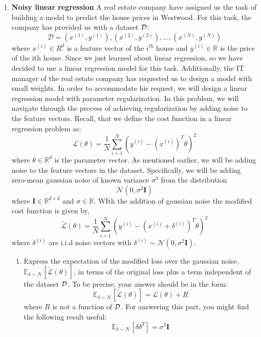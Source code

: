 \documentclass{article}
\newcommand{\R}{\mathbb{R}}
\renewcommand{\it}[1]{\textit{{#1}}}
\renewcommand{\bf}[1]{\textbf{{#1}}}
\begin{document}
    \begin{enumerate}
        \item \bf{Noisy linear regression} \vspace{11pt}
            A real estate company have assigned us the task of building a model to predict the house
            prices in Westwood. For this task, the company has provided us with a dataset $\cal{D}$:
            \[\mathcal{D} = {(x^{(1)}, y^{(1)}), (x^{(2)}, y^{(2)}), \ldots, (x^{(N)}, y^{(N)})}\]
            where $x^{(i)} \in R^d$ is a feature vector of the $i^{\it{th}}$ house and $y^{(i)} \in \R$ 
            is the price of the ith house. Since we just learned about linear regression, so we have 
            decided to use a linear regression model for this task. Additionally, the IT manager of 
            the real estate company has requested us to design a model with small weights. In order 
            to accommodate his request, we will design a linear regression model with parameter 
            regularization. In this problem, we will navigate through the process of achieving 
            regularization by adding noise to the feature vectors. Recall, that we define the cost 
            function in a linear regression problem as:
            \[\mathcal{L} (\theta) = \frac{1}{N} \sum^{N}_{i = 1} (y^{(i)} - (x^{(i)})^T \theta)^2\]
            where $\theta \in \R^d$ is the parameter vector. As mentioned earlier, we will be adding 
            noise to the feature vectors in the dataset. Specifically, we will be adding zero-mean 
            gaussian noise of known variance $\sigma^2$ from the distribution
            \[\mathcal{N} (0, \sigma^2 \bf{I})\]
            where $\bf{I} \in \R^{d \times d}$ and $\sigma \in \R$. WIth the addition of gaussian
            noise the modified cost function is given by,
            \[\tilde{\mathcal{L}} (\theta) = \frac{1}{N}\sum^{N}_{i = 1} (y^{(i)} - (x^{(i)} + \delta^{(i)})^T \theta)^2\]
            where $\delta^{(i)}$ are i.i.d noise vectors with $\delta^{(i)} \sim \mathcal{N} (0, \sigma^2 \bf{I})$.
            \begin{enumerate}
                \item Express the expectation of the modified loss over the gaussian noise, 
                    $\mathbb{E}_{\delta \sim \mathcal{N}} [\tilde{\mathcal{L}} (\theta)]$, in terms of
                    the original loss plus a term independent of the dataset $\cal{D}$. To be precise, 
                    your answer should be in the form:
                    \[\mathbb{E}_{\delta \sim \mathcal{N}} [\tilde{\mathcal{L}} (\theta)] = \mathcal{L} (\theta) + R\]
                    where $R$ is not a function of $\cal{D}$. For answering this part, you might find the following result useful:
                    \[\mathbb{E}_{\delta \sim \mathcal{N}} [\delta \delta^T] = \sigma^2 \bf{I}\]


\end{enumerate}
\end{enumerate}
\end{document}
